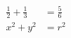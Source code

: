 \documentclass[preview]{standalone}
\begin{document}
\begin{align*}
\frac{1}{2} + \frac{1}{3} &= \frac{5}{6} \\ x^2 + y^2 &= r^2
\end{align*}
\end{document}
